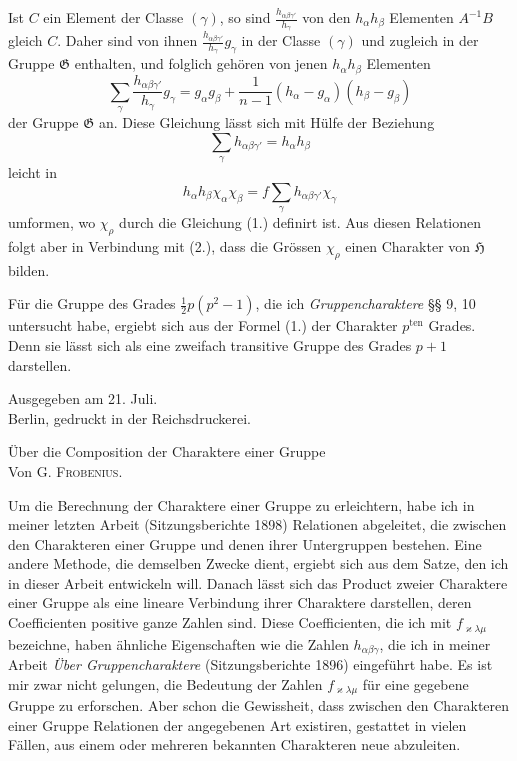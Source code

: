 \documentclass[11pt]{article}
\newcommand{\Hgr}{\mathfrak{H}}
\newcommand{\Ggr}{\mathfrak{G}}
\begin{document}
Ist $C$ ein Element der Classe $(\gamma)$, so sind $\frac{h_{\alpha\beta\gamma'}}{h_\gamma}$ von den $h_\alpha h_\beta$ Elementen $A^{-1}B$ gleich $C$. Daher sind von ihnen $\frac{h_{\alpha\beta\gamma'}}{h_\gamma}g_\gamma$ in der Classe $(\gamma)$ und zugleich in der Gruppe $\Ggr$ enthalten, und folglich gehören von jenen $h_\alpha h_\beta$ Elementen
\[
  \sum_\gamma \frac{h_{\alpha\beta\gamma'}}{h_\gamma}g_\gamma
  =
  g_\alpha g_\beta+\frac{1}{n-1}(h_\alpha-g_\alpha)(h_\beta-g_\beta)
\]
der Gruppe $\Ggr$ an. Diese Gleichung lässt sich mit Hülfe der Beziehung
\[
  \sum_\gamma h_{\alpha\beta\gamma'}=h_\alpha h_\beta
\]
leicht in
\[
\tag{5.}
  h_\alpha h_\beta\chi_\alpha\chi_\beta
  =
  f\sum_\gamma h_{\alpha\beta\gamma'}\chi_\gamma
\]
umformen, wo $\chi_\rho$ durch die Gleichung (1.) definirt ist. Aus diesen Relationen folgt aber in Verbindung mit (2.), dass die Grössen $\chi_\rho$ einen Charakter von $\Hgr$ bilden.

Für die Gruppe des Grades $\frac12 p(p^2-1)$, die ich \emph{Gruppencharaktere} §§ 9, 10 untersucht habe, ergiebt sich aus der Formel (1.) der Charakter $p^{\mathrm{ten}}$ Grades. Denn sie lässt sich als eine zweifach transitive Gruppe des Grades $p+1$ darstellen.

\begin{center}
\small Ausgegeben am 21. Juli.\\[1.5em]
Berlin, gedruckt in der Reichsdruckerei.
\end{center}

\clearpage

\begin{center}
{\Large Über die Composition der Charaktere einer Gruppe}\\[0.75em]
Von G. \textsc{Frobenius}.
\end{center}

Um die Berechnung der Charaktere einer Gruppe zu erleichtern, habe ich in meiner letzten Arbeit (Sitzungsberichte 1898) Relationen abgeleitet, die zwischen den Charakteren einer Gruppe und denen ihrer Untergruppen bestehen. Eine andere Methode, die demselben Zwecke dient, ergiebt sich aus dem Satze, den ich in dieser Arbeit entwickeln will. Danach lässt sich das Product zweier Charaktere einer Gruppe als eine lineare Verbindung ihrer Charaktere darstellen, deren Coefficienten positive ganze Zahlen sind. Diese Coefficienten, die ich mit $f_{\varkappa\lambda\mu}$ bezeichne, haben ähnliche Eigenschaften wie die Zahlen $h_{\alpha\beta\gamma}$, die ich in meiner Arbeit \emph{Über Gruppencharaktere} (Sitzungsberichte 1896) eingeführt habe. Es ist mir zwar nicht gelungen, die Bedeutung der Zahlen $f_{\varkappa\lambda\mu}$ für eine gegebene Gruppe zu erforschen. Aber schon die Gewissheit, dass zwischen den Charakteren einer Gruppe Relationen der angegebenen Art existiren, gestattet in vielen Fällen, aus einem oder mehreren bekannten Charakteren neue abzuleiten.
\end{document}
